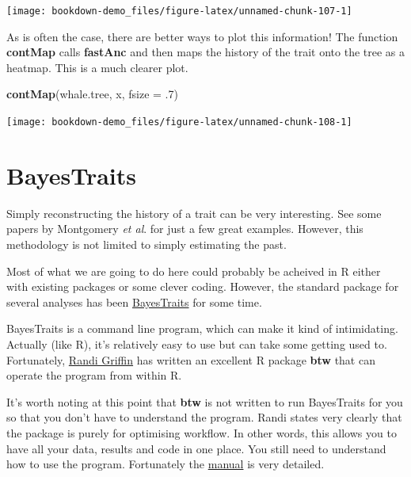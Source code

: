 \documentclass[
]{book}
\newenvironment{Shaded}{\begin{snugshade}}{\end{snugshade}}
\newcommand{\DataTypeTok}[1]{\textcolor[rgb]{0.13,0.29,0.53}{#1}}
\newcommand{\FloatTok}[1]{\textcolor[rgb]{0.00,0.00,0.81}{#1}}
\newcommand{\KeywordTok}[1]{\textcolor[rgb]{0.13,0.29,0.53}{\textbf{#1}}}
\newcommand{\NormalTok}[1]{#1}
\begin{document}
\begin{center}\texttt{[image: bookdown-demo\_files/figure-latex/unnamed-chunk-107-1]} \end{center}

As is often the case, there are better ways to plot this information! The function \textbf{contMap} calls \textbf{fastAnc} and then maps the history of the trait onto the tree as a heatmap. This is a much clearer plot.

\begin{Shaded}
\begin{Highlighting}[]
\KeywordTok{contMap}\NormalTok{(whale.tree, x, }\DataTypeTok{fsize =} \FloatTok{.7}\NormalTok{)}
\end{Highlighting}
\end{Shaded}

\begin{center}\texttt{[image: bookdown-demo\_files/figure-latex/unnamed-chunk-108-1]} \end{center}

\hypertarget{bayestraits}{%
\section{BayesTraits}\label{bayestraits}}

Simply reconstructing the history of a trait can be very interesting. See some papers by Montgomery \emph{et al}. \citetext{\citeyear{Montgomery10}; \citeyear{Montgomery13}} for just a few great examples. However, this methodology is not limited to simply estimating the past.

Most of what we are going to do here could probably be acheived in R either with existing packages or some clever coding. However, the standard package for several analyses has been \href{http://www.evolution.rdg.ac.uk/BayesTraitsV3.0.2/BayesTraitsV3.0.2.html}{BayesTraits} for some time.

BayesTraits is a command line program, which can make it kind of intimidating. Actually (like R), it's relatively easy to use but can take some getting used to. Fortunately, \href{https://www.randigriffin.com/}{Randi Griffin} has written an excellent R package \textbf{btw} that can operate the program from within R.

It's worth noting at this point that \textbf{btw} is not written to run BayesTraits for you so that you don't have to understand the program. Randi states very clearly that the package is purely for optimising workflow. In other words, this allows you to have all your data, results and code in one place. You still need to understand how to use the program. Fortunately the \href{http://www.evolution.rdg.ac.uk/BayesTraitsV3.0.2/Files/BayesTraitsV3.0.2Manual.pdf}{manual} is very detailed.
\end{document}
